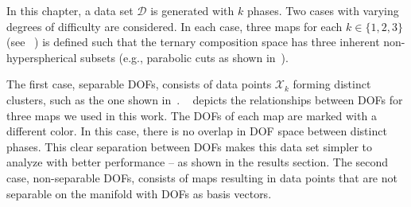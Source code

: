 In this chapter, a data set $\mathcal{D}$ is generated with $k$ phases. Two cases with varying degrees of difficulty are considered.
In each case, three maps for each $k \in \{ 1,2,3 \}$ (see ~) is defined such that the ternary composition space has three inherent non-hyperspherical subsets (e.g., parabolic cuts as shown in~). 

The first case, separable DOFs, consists of data points $\mathcal{X}_k$ forming distinct clusters, such as the one shown in~. 
~ depicts the relationships between DOFs for three maps we used in this work.
The DOFs of each map are marked with a different color. 
In this case, there is no overlap in DOF space between distinct phases.
This clear separation between DOFs makes this data set simpler to analyze with better performance -- as shown in the results section. 
The second case, non-separable DOFs, consists of maps resulting in data points that are not separable on the manifold with DOFs as basis vectors.
